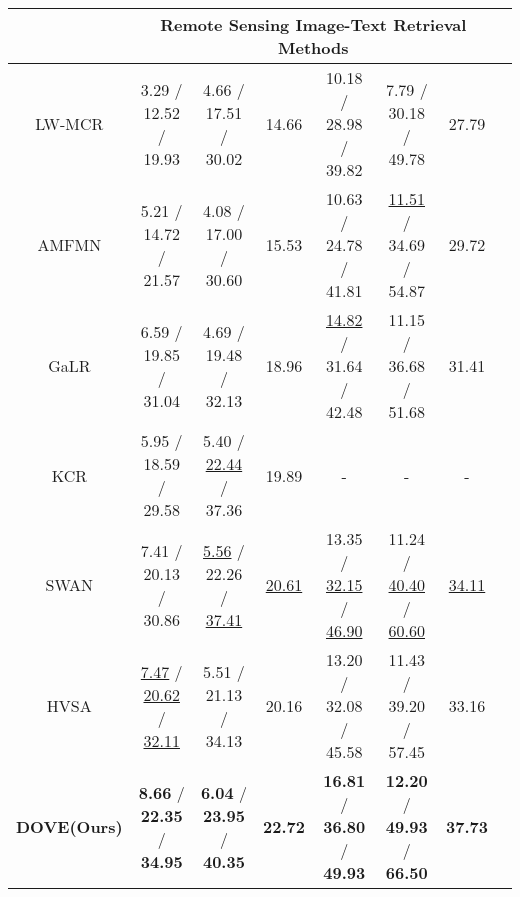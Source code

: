 \documentclass[journal]{IEEEtran}
\begin{document}
\begin{table*}[htbp]
{\begin{tabular}{cccccccc}
\multicolumn{1}{l}{}                     & \multicolumn{6}{c}{Remote Sensing Image-Text Retrieval Methods}    \\\hline
\multicolumn{1}{c|}{LW-MCR}              & 3.29 / 12.52 / 19.93                        & 4.66 / 17.51 / 30.02                        & \multicolumn{1}{c|}{14.66}                        & 10.18 / 28.98 / 39.82                        & 7.79 / 30.18 / 49.78                        & 27.79                        \\
\multicolumn{1}{c|}{AMFMN}               & 5.21 / 14.72 / 21.57                        & 4.08 / 17.00 / 30.60                        & \multicolumn{1}{c|}{15.53}                        & 10.63 / 24.78 / 41.81                        & \underline{11.51} / 34.69 / 54.87                       & 29.72                        \\
\multicolumn{1}{c|}{GaLR}                & 6.59 / 19.85 / 31.04                        & 4.69 / 19.48 / 32.13                        & \multicolumn{1}{c|}{18.96}                        & \underline{14.82} / 31.64 / 42.48               & 11.15 / 36.68 / 51.68                       & 31.41                        \\
\multicolumn{1}{c|}{KCR}                 & 5.95 / 18.59 / 29.58                        & 5.40 / \underline{22.44} / 37.36                        & \multicolumn{1}{c|}{19.89}                        & -                                            & -                                           & -                      \\
\multicolumn{1}{c|}{SWAN}                 & 7.41 / 20.13 / 30.86                        & \underline{5.56} / 22.26 / \underline{37.41}                        & \multicolumn{1}{c|}{\underline{20.61}}                        & 13.35 / \underline{32.15} / \underline{46.90}                                           & 11.24 / \underline{40.40} / \underline{60.60}                                          & \underline{34.11}                           \\ 
\multicolumn{1}{c|}{HVSA}                 & \underline{7.47} / \underline{20.62} / \underline{32.11}                        & 5.51 / 21.13 / 34.13                        & \multicolumn{1}{c|}{20.16}                       & 13.20 / 32.08 / 45.58                                           & 11.43 / 39.20 / 57.45                                         & 33.16                           \\ \hline
\multicolumn{1}{c|}{\textbf{DOVE(Ours)}} & \textbf{8.66} / \textbf{22.35} / \textbf{34.95}               & \textbf{6.04} / \textbf{23.95} / \textbf{40.35}               & \multicolumn{1}{c|}{\textbf{22.72}}               & \textbf{16.81} / \textbf{36.80} / \textbf{49.93}                        & \textbf{12.20} / \textbf{49.93} / \textbf{66.50}              & \textbf{37.73}            

\\ \hline
\end{tabular}}
\end{table*}
\end{document}
